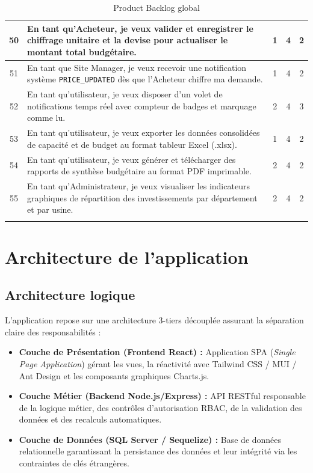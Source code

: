 \begin{longtable}{|c|p{8.8cm}|c|c|c|}
50 & En tant qu'Acheteur, je veux valider et enregistrer le chiffrage unitaire et la devise pour actualiser le montant total budgétaire. & 1 & 4 & 2 \\ \hline
51 & En tant que Site Manager, je veux recevoir une notification système \texttt{PRICE\_UPDATED} dès que l'Acheteur chiffre ma demande. & 1 & 4 & 2 \\ \hline
52 & En tant qu'utilisateur, je veux disposer d'un volet de notifications temps réel avec compteur de badges et marquage comme lu. & 2 & 4 & 3 \\ \hline
53 & En tant qu'utilisateur, je veux exporter les données consolidées de capacité et de budget au format tableur Excel (.xlsx). & 1 & 4 & 2 \\ \hline
54 & En tant qu'utilisateur, je veux générer et télécharger des rapports de synthèse budgétaire au format PDF imprimable. & 2 & 4 & 2 \\ \hline
55 & En tant qu'Administrateur, je veux visualiser les indicateurs graphiques de répartition des investissements par département et par usine. & 2 & 4 & 2 \\ \hline
\caption{Product Backlog global}
\label{tab:product_backlog_global}
\end{longtable}

\section{Architecture de l'application}

\subsection{Architecture logique}
L'application repose sur une architecture 3-tiers découplée assurant la séparation claire des responsabilités :
\begin{itemize}
    \item \textbf{Couche de Présentation (Frontend React) :} Application SPA (\textit{Single Page Application}) gérant les vues, la réactivité avec Tailwind CSS / MUI / Ant Design et les composants graphiques Charts.js.
    \item \textbf{Couche Métier (Backend Node.js/Express) :} API RESTful responsable de la logique métier, des contrôles d'autorisation RBAC, de la validation des données et des recalculs automatiques.
    \item \textbf{Couche de Données (SQL Server / Sequelize) :} Base de données relationnelle garantissant la persistance des données et leur intégrité via les contraintes de clés étrangères.
\end{itemize}

